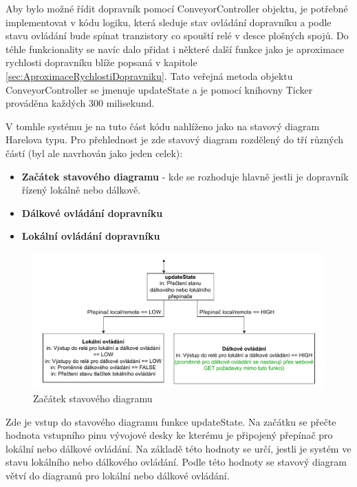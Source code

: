 Aby bylo možné řídit dopravník pomocí ConveyorController objektu, je potřebné implementovat v kódu logiku, která sleduje stav ovládání dopravníku a podle stavu ovládání bude spínat tranzistory co spouští relé v desce plošných spojů. Do téhle funkcionality se navíc dalo přidat i některé další funkce jako je aproximace rychlosti dopravníku blíže popsaná v kapitole \ref{sec:AproximaceRychlostiDopravniku}. Tato veřejná metoda objektu ConveyorController se jmenuje updateState a je pomocí knihovny Ticker prováděna každých 300 milisekund.

V tomhle systému je na tuto část kódu nahlíženo jako na stavový diagram Harelova typu. Pro přehlednost je zde stavový diagram rozdělený do tří různých částí (byl ale navrhován jako jeden celek):
\begin{itemize}
	\item \textbf{Začátek stavového diagramu} - kde se rozhoduje hlavně jestli je dopravník řízený lokálně nebo dálkově.
	\item \textbf{Dálkové ovládání dopravníku}
	\item \textbf{Lokální ovládání dopravníku}
\end{itemize}

\begin{figure}[H]
	\centering
	\includegraphics[width=1\linewidth]{images/StateFlow_Firmwaru_top.drawio.pdf}
	\caption{Začátek stavového diagramu}
	\label{fig:StateFlow_Firmwaru_top}
\end{figure}

Zde je vstup do stavového diagramu funkce updateState. Na začátku se přečte hodnota vstupního pinu vývojové desky ke kterému je připojený přepínač pro lokální nebo dálkové ovládání. Na základě této hodnoty se určí, jestli je systém ve stavu lokálního nebo dálkového ovládání. Podle této hodnoty se stavový diagram větví do diagramů pro lokální nebo dálkové ovládání.

